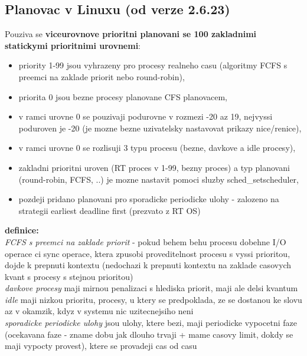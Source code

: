 \documentclass[a4paper, 11pt]{article}
\begin{document}
\subsection{Planovac v Linuxu (od verze 2.6.23)}
Pouziva se \textbf{viceurovnove prioritni planovani se 100 zakladnimi statickymi prioritnimi urovnemi}:
\begin{itemize}
    \item priority 1-99 jsou vyhrazeny pro procesy realneho casu (algoritmy FCFS s preemci na zaklade priorit nebo round-robin),
    \item priorita 0 jsou bezne procesy planovane CFS planovacem,
    \item v ramci urovne 0 se pouzivaji podurovne v rozmezi -20 az 19, nejvyssi poduroven je -20 (je mozne bezne uzivatelsky nastavovat prikazy nice/renice),
    \item v ramci urovne 0 se rozlisuji 3 typu procesu (bezne, davkove a idle procesy),
    \item zakladni prioritni uroven (RT proces v 1-99, bezny proces) a typ planovani (round-robin, FCFS, ..) je mozne nastavit pomoci sluzby sched\_setscheduler,
    \item pozdeji pridano planovani pro sporadicke periodicke ulohy - zalozeno na strategii earliest deadline first (prezvato z RT OS) \\
\end{itemize}

\textbf{definice:} \\[0.5em]
\textit{FCFS s preemci na zaklade priorit} - pokud behem behu procesu dobehne I/O operace ci sync operace, ktera zpusobi proveditelnost procesu s vyssi prioritou, dojde k prepnuti kontextu  (nedochazi k prepnuti kontextu na zaklade casovych kvant s procesy s stejnou prioritou) \\[0.2em]
\textit{davkove procesy} maji mirnou penalizaci s hlediska priorit, maji ale delsi kvantum \\[0.2em]
\textit{idle} maji nizkou prioritu, procesy, u ktery se predpoklada, ze se dostanou ke slovu az v okamzik, kdyz v systemu nic uzitecnejsiho neni \\[0.2em]
\textit{sporadicke periodicke ulohy} jsou ulohy, ktere bezi, maji periodicke vypocetni faze (ocekavana faze - zname dobu jak dlouho trvaji + mame casovy limit, dokdy se maji vypocty provest), ktere se provadeji cas od casu \\[0.2em]
\end{document}
